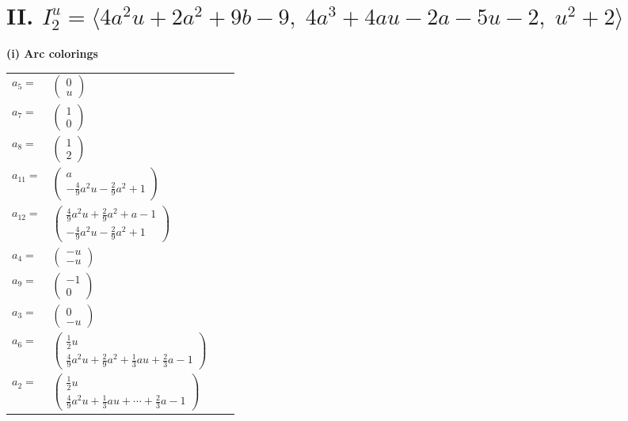\documentclass[1p]{elsarticle_modified}
\theoremstyle{definition}
\begin{document}
\centering \section*{II. $I^u_{2}= \langle 4 a^2 u+2 a^2+9 b-9,\;4 a^3+4 a u-2 a-5 u-2,\;u^2+2 \rangle$}
\flushleft \textbf{(i) Arc colorings}\\
\begin{tabular}{m{7pt} m{180pt} m{7pt} m{180pt} }
\flushright $a_{5}=$&$\begin{pmatrix}0\\u\end{pmatrix}$ \\
\flushright $a_{7}=$&$\begin{pmatrix}1\\0\end{pmatrix}$ \\
\flushright $a_{8}=$&$\begin{pmatrix}1\\2\end{pmatrix}$ \\
\flushright $a_{11}=$&$\begin{pmatrix}a\\-\frac{4}{9} a^2 u-\frac{2}{9} a^2+1\end{pmatrix}$ \\
\flushright $a_{12}=$&$\begin{pmatrix}\frac{4}{9} a^2 u+\frac{2}{9} a^2+a-1\\-\frac{4}{9} a^2 u-\frac{2}{9} a^2+1\end{pmatrix}$ \\
\flushright $a_{4}=$&$\begin{pmatrix}- u\\- u\end{pmatrix}$ \\
\flushright $a_{9}=$&$\begin{pmatrix}-1\\0\end{pmatrix}$ \\
\flushright $a_{3}=$&$\begin{pmatrix}0\\- u\end{pmatrix}$ \\
\flushright $a_{6}=$&$\begin{pmatrix}\frac{1}{2} u\\\frac{4}{9} a^2 u+\frac{2}{9} a^2+\frac{1}{3} a u+\frac{2}{3} a-1\end{pmatrix}$ \\
\flushright $a_{2}=$&$\begin{pmatrix}\frac{1}{2} u\\\frac{4}{9} a^2 u+\frac{1}{3} a u+\cdots+\frac{2}{3} a-1\end{pmatrix}$ \\

\end{tabular}
\end{document}
